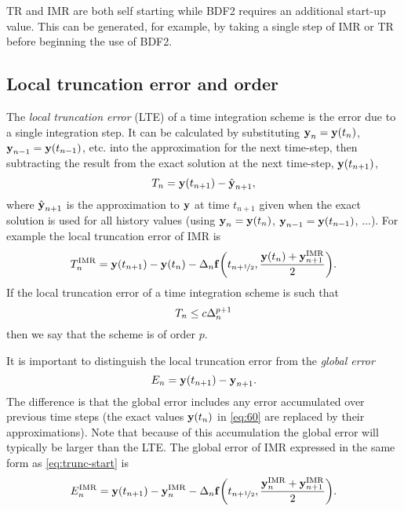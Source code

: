 TR and IMR are both self starting while BDF2 requires an additional start-up value.
This can be generated, for example, by taking a single step of IMR or TR before beginning the use of BDF2.


\subsection{Local truncation error and order}
\label{sec:deriv-local-trunc}

The \emph{local truncation error} (LTE) of a time integration scheme is the error due to a single integration step.
It can be calculated by substituting $\boldsymbol{\mathrm{y}}_n = \boldsymbol{\mathrm{y}}(t_n)$, $\boldsymbol{\mathrm{y}}_{n-1} = \boldsymbol{\mathrm{y}}(t_{n-1})$, etc. into the approximation for the next time-step, then subtracting the result from the exact solution at the next time-step, $\boldsymbol{\mathrm{y}}(t_{n+1})$, \ie
\begin{equation}
  \label{eq:60}
  T_n = \boldsymbol{\mathrm{y}}(t_{n+1}) - \hat{\boldsymbol{\mathrm{y}}}_{n+1},
\end{equation}
where $\hat{\boldsymbol{\mathrm{y}}}_{n+1}$ is the approximation to $\boldsymbol{\mathrm{y}}$ at time $t_{n+1}$ given when the exact solution is used for all history values (\ie using $\boldsymbol{\mathrm{y}}_{n} = \boldsymbol{\mathrm{y}}(t_n)$, $\boldsymbol{\mathrm{y}}_{n-1} = \boldsymbol{\mathrm{y}}(t_{n-1})$, $\ldots$).
For example the local truncation error of IMR is
\begin{equation}
  T_n^{\mathrm{IMR}} =  \boldsymbol{\mathrm{y}}(t_{n+1}) - \boldsymbol{\mathrm{y}}(t_n) - \Delta_{n} {\boldsymbol{\mathrm{f}}{\left( t_{n+\nicefrac{1}{2}}, \frac{\boldsymbol{\mathrm{y}}(t_n) + \boldsymbol{\mathrm{y}}_{n+1}^{\mathrm{IMR}}}{2} \right)}}.
  \label{eq:trunc-start}
\end{equation}
If the local truncation error of a time integration scheme is such that
\begin{equation}
  T_n \leq c \Delta_{n}^{p+1}
\end{equation}
then we say that the scheme is of order $p$.

It is important to distinguish the local truncation error from the \emph{global error}
\begin{equation}
  \label{eq:global-temporal-error}
    E_n = \boldsymbol{\mathrm{y}}(t_{n+1}) - \boldsymbol{\mathrm{y}}_{n+1}.
\end{equation}
The difference is that the global error includes any error accumulated over previous time steps (\ie the exact values $\boldsymbol{\mathrm{y}}(t_n)$ in \cref{eq:60} are replaced by their approximations).
Note that because of this accumulation the global error will typically be larger than the LTE.
The global error of IMR expressed in the same form as \cref{eq:trunc-start} is
\begin{equation}
  E_n^{\mathrm{IMR}} =  \boldsymbol{\mathrm{y}}(t_{n+1}) - \boldsymbol{\mathrm{y}}_n^{\mathrm{IMR}} - \Delta_{n} {\boldsymbol{\mathrm{f}}{\left(  t_{n+\nicefrac{1}{2}}, \frac{\boldsymbol{\mathrm{y}}_n^{\mathrm{IMR}} + \boldsymbol{\mathrm{y}}_{n+1}^{\mathrm{IMR}}}{2}  \right)}}.
\end{equation}

